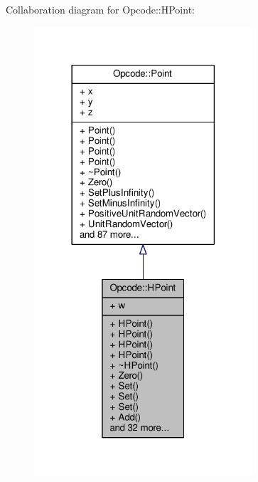 Collaboration diagram for Opcode\+:\+:H\+Point\+:
\nopagebreak
\begin{figure}[H]
\begin{center}
\leavevmode
\includegraphics[width=230pt]{db/d4d/classOpcode_1_1HPoint__coll__graph}
\end{center}
\end{figure}

